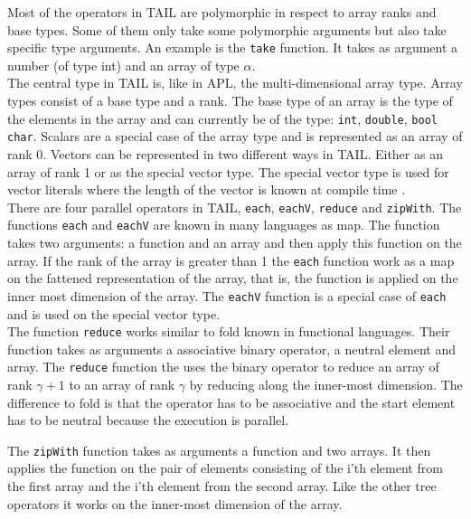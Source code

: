 \documentclass[11pt]{article}
\begin{document}
Most of the operators in TAIL are polymorphic in respect to array ranks and base types.
Some of them only take some polymorphic arguments but also take specific type arguments.
An example is the {\tt take} function. It takes as argument a number (of type int) and an array of type $\alpha$.\\

The central type in TAIL is, like in APL, the multi-dimensional array type.
Array types consist of a base type and a rank.
The base type of an array is the type of the elements in the array and can currently be of the
type: {\tt int}, {\tt double}, {\tt bool} {\tt char}. 
Scalars are a special case of the array type and is represented as an array of rank 0. 
Vectors can be represented in two different ways in TAIL.
Either as an array of rank 1 or as the special vector type.
The special vector type is used for vector literals where the length of the vector is known at compile time \cite{ElsmanDybdal:Array:2014}. \\


There are four parallel operators in TAIL, {\tt each}, {\tt eachV}, {\tt reduce} and {\tt zipWith}.
The functions {\tt each} and {\tt eachV} are known in many languages as map.
The function takes two arguments: a function and an array and then apply this function on the array.
If the rank of the array is greater than 1 the {\tt each} function work as a map on the fattened representation of the array,
that is, the function is applied on the inner most dimension of the array.
The {\tt eachV} function is a special case of {\tt each} and is used on the special vector type.\\

The function {\tt reduce} works similar to fold known in functional languages.
Their function takes as arguments a associative binary operator, a neutral element and array.
The {\tt reduce} function the uses the binary operator 
to reduce an array of rank $\gamma+1$ to an array of rank $\gamma$ by reducing along the inner-most dimension.
The difference to fold is that the operator has to be associative and the start element has to be neutral
because the execution is parallel.

The {\tt zipWith} function takes as arguments a function and two arrays.
It then applies the function on the pair of elements consisting of the i'th element
from the first array and the i'th element from the second array.
Like the other tree operators it works on the inner-most dimension of the array\cite{ElsmanDybdal:Array:2014}. \\
\end{document}
